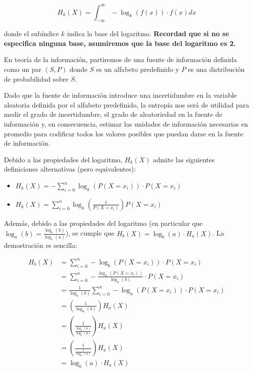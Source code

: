 \[
H_k(X) = \int_{-\infty}^{\infty} -\log_k\left(f(x)\right) \cdot f(x)dx
\]

donde el subíndice \(k\) indica la base del logaritmo. \textbf{Recordad
que si no se especifica ninguna base, asumiremos que la base del
logaritmo es 2.}

En teoría de la información, partiremos de una fuente de información
definida como un par \((S,P)\) donde \(S\) es un alfabeto predefinido y
\(P\) es una distribución de probabilidad sobre \(S\).

Dado que la fuente de información introduce una incertidumbre en la
variable aleatoria definida por el alfabeto predefinido, la entropía nos
será de utilidad para medir el grado de incertidumbre, el grado de
aleatoriedad en la fuente de información y, en consecuencia, estimar las
unidades de información necesarias en promedio para codificar todos los
valores posibles que puedan darse en la fuente de información.

Debido a las propiedades del logaritmo, \(H_k(X)\) admite las siguientes
definiciones alternativas (pero equivalentes):

\begin{itemize}
\tightlist
\item
  \(H_k(X) = -\sum_{i=0}^n\log_k\left(P(X=x_i)\right)\cdot P(X=x_i)\)
\item
  \(H_k(X) = \sum_{i=0}^n \log_k\left(\frac{1}{P(X=x_i)}\right)P(X=x_i)\)
\end{itemize}

Además, debido a las propiedades del logaritmo (en particular que
\(\log_a(b)=\frac{\log_c(b)}{\log_c(a)}\)), se cumple que
\(H_b(X)=\log_b(a)\cdot H_a(X)\). La demostración es sencilla:


\begin{align*}
H_b(X) &= \sum_{i=0}^n -\log_b\left(P(X=x_i)\right) \cdot P(X=x_i) \\
&= \sum_{i=0}^n -\frac{\log_a\left(P(X=x_i)\right)}{\log_a(b)} \cdot P(X=x_i) \\
&= \frac{1}{\log_a(b)}\sum_{i=0}^n -\log_a\left(P(X=x_i)\right) \cdot P(X=x_i) \\
&= \left(\frac{1}{\log_a(b)}\right)H_a(X) \\
&= \left(\frac{1}{\frac{\log_b(b)}{\log_b(a)}}\right)H_a(X) \\
&= \left(\frac{1}{\frac{1}{\log_b(a)}}\right)H_a(X) \\
&= \log_b(a)\cdot H_a(X) \\
\end{align*}

